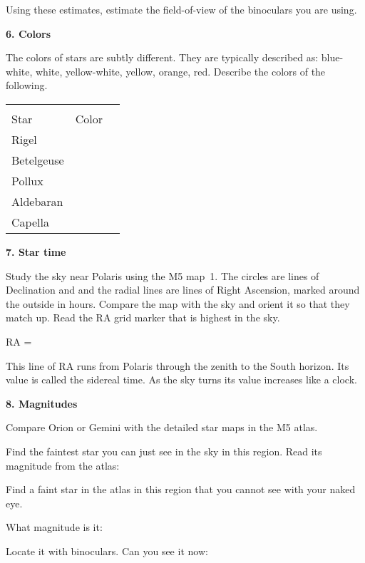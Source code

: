 \noindent Using these estimates, estimate the field-of-view of the binoculars
you are using.

\clearpage 
\medskip\noindent
{\bf 6. Colors}

\bigskip\noindent 
The colors of stars are subtly different. 
They are typically described as: blue-white, white,
yellow-white, yellow, orange, red.  Describe the colors of the following.
  
\begin{center}
\begin{tabular}{lcc} \hline \\  [-6pt]
Star   &\hspace{1.5cm}  Color \hspace{1.5cm} &  \\  [6pt]
\hline
Rigel    &   &        \\ \hline
Betelgeuse     &   &       \\ \hline
Pollux     &   &       \\ \hline
Aldebaran    &   &       \\  \hline
Capella    &   &     \\  \hline 
\end{tabular}
\end{center}


\medskip\noindent
{\bf 7. Star time}

\bigskip\noindent
Study the sky near Polaris using the M5 map~1.  
The circles are lines of Declination and 
and the radial lines are lines of Right Ascension, marked around the 
outside in hours. Compare the map with the sky and
orient it so that they match up. Read the RA grid marker that is
highest in the sky. 

\medskip
{\hfill RA = \makebox[4cm]{\hrulefill} \hfill }

\medskip
This line of RA runs from Polaris through the zenith to the South
horizon. Its value is called the sidereal time. As the sky turns its
value increases like a clock. 

\bigskip\noindent
{\bf 8. Magnitudes}

\bigskip\noindent Compare Orion
or Gemini with the detailed star maps
in the M5 atlas.

Find the faintest star you can just see in the sky in this region. Read its
magnitude from the atlas:  \makebox[4cm]{\hrulefill}

\smallskip\noindent
Find a faint star in the atlas in this region that you cannot see with
your naked eye.
 
What magnitude is it: \makebox[4cm]{\hrulefill}
 
Locate it with binoculars. Can you see it now: \makebox[4cm]{\hrulefill}


\newpage

\begin{figure*}[h]
        \centerline{}
        \caption{}
         \end{figure*}









